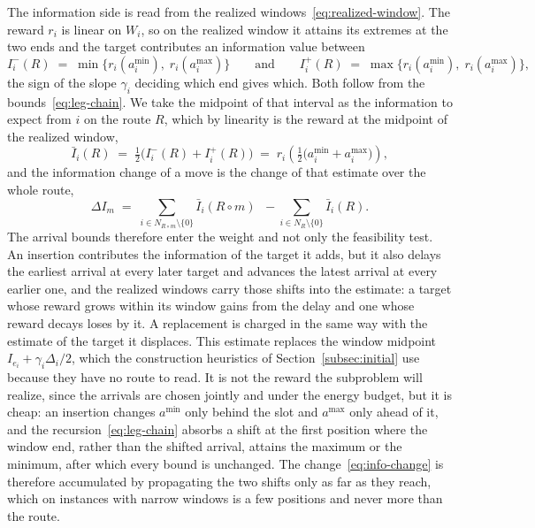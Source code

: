 The information side is read from the realized windows~\eqref{eq:realized-window}. The reward $r_i$ is linear on $W_i$, so on the realized window it attains its extremes at the two ends and the target contributes an information value between
\begin{equation}\label{eq:info-bounds}
    I^-_i(R) \;=\; \min\bigl\{ r_i(a^{\min}_i),\; r_i(a^{\max}_i) \bigr\}
    \qquad \text{and} \qquad
    I^+_i(R) \;=\; \max\bigl\{ r_i(a^{\min}_i),\; r_i(a^{\max}_i) \bigr\} ,
\end{equation}
the sign of the slope $\gamma_i$ deciding which end gives which. Both follow from the bounds~\eqref{eq:leg-chain}. We take the midpoint of that interval as the information to expect from $i$ on the route $R$, which by linearity is the reward at the midpoint of the realized window,
\begin{equation}\label{eq:info-mid}
    \bar{I}_i(R) \;=\; \tfrac{1}{2}\bigl( I^-_i(R) + I^+_i(R) \bigr) \;=\; r_i\!\left( \tfrac{1}{2}\bigl( a^{\min}_i + a^{\max}_i \bigr) \right) ,
\end{equation}
and the information change of a move is the change of that estimate over the whole route,
\begin{equation}\label{eq:info-change}
    \Delta I_m \;=\; \sum_{i \in N_{R \circ m} \setminus \{0\}} \bar{I}_i(R \circ m) \;\;-\!\! \sum_{i \in N_R \setminus \{0\}} \bar{I}_i(R) .
\end{equation}
The arrival bounds therefore enter the weight and not only the feasibility test. An insertion contributes the information of the target it adds, but it also delays the earliest arrival at every later target and advances the latest arrival at every earlier one, and the realized windows carry those shifts into the estimate: a target whose reward grows within its window gains from the delay and one whose reward decays loses by it. A replacement is charged in the same way with the estimate of the target it displaces. This estimate replaces the window midpoint $I_{e_i} + \gamma_i \Delta_i / 2$, which the construction heuristics of Section~\ref{subsec:initial} use because they have no route to read. It is not the reward the subproblem will realize, since the arrivals are chosen jointly and under the energy budget, but it is cheap: an insertion changes $a^{\min}$ only behind the slot and $a^{\max}$ only ahead of it, and the recursion~\eqref{eq:leg-chain} absorbs a shift at the first position where the window end, rather than the shifted arrival, attains the maximum or the minimum, after which every bound is unchanged. The change~\eqref{eq:info-change} is therefore accumulated by propagating the two shifts only as far as they reach, which on instances with narrow windows is a few positions and never more than the route.

